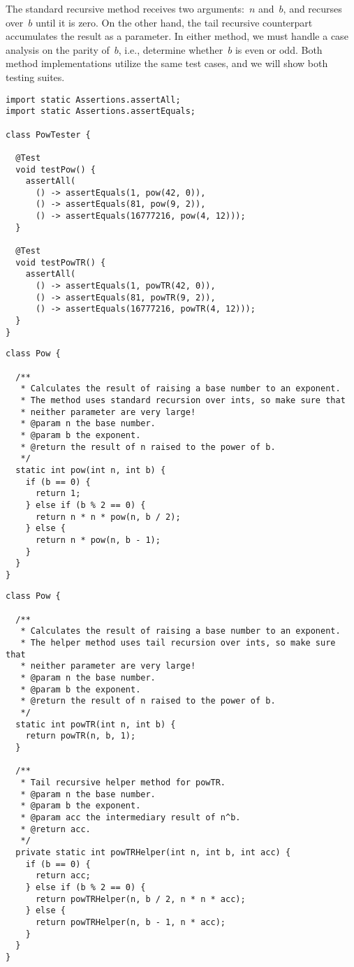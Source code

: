 The standard recursive  method receives two arguments:~$n$ and~$b$, and recurses over~$b$ until it is zero.
On the other hand, the tail recursive counterpart accumulates the result as a parameter.
In either method, we must handle a case analysis on the parity of~$b$, i.e., determine whether~$b$ is even or odd.
Both method implementations utilize the same test cases, and we will show both testing suites.

\begin{lstlisting}[language=MyJava]
import static Assertions.assertAll;
import static Assertions.assertEquals;

class PowTester {

  @Test
  void testPow() {
    assertAll(
      () -> assertEquals(1, pow(42, 0)),
      () -> assertEquals(81, pow(9, 2)),
      () -> assertEquals(16777216, pow(4, 12)));
  }

  @Test
  void testPowTR() {
    assertAll(
      () -> assertEquals(1, powTR(42, 0)),
      () -> assertEquals(81, powTR(9, 2)),
      () -> assertEquals(16777216, powTR(4, 12)));
  }
}
\end{lstlisting}

\begin{lstlisting}[language=MyJava]
class Pow {

  /**
   * Calculates the result of raising a base number to an exponent.
   * The method uses standard recursion over ints, so make sure that
   * neither parameter are very large!
   * @param n the base number.
   * @param b the exponent.
   * @return the result of n raised to the power of b.
   */
  static int pow(int n, int b) {
    if (b == 0) {
      return 1;
    } else if (b % 2 == 0) {
      return n * n * pow(n, b / 2);
    } else {
      return n * pow(n, b - 1);
    }
  }
}
\end{lstlisting}

\begin{lstlisting}[language=MyJava]
class Pow {

  /**
   * Calculates the result of raising a base number to an exponent.
   * The helper method uses tail recursion over ints, so make sure that
   * neither parameter are very large!
   * @param n the base number.
   * @param b the exponent.
   * @return the result of n raised to the power of b.
   */
  static int powTR(int n, int b) {
    return powTR(n, b, 1);
  }

  /**
   * Tail recursive helper method for powTR.
   * @param n the base number.
   * @param b the exponent.
   * @param acc the intermediary result of n^b.
   * @return acc.
   */
  private static int powTRHelper(int n, int b, int acc) {
    if (b == 0) { 
      return acc; 
    } else if (b % 2 == 0) {
      return powTRHelper(n, b / 2, n * n * acc);
    } else {
      return powTRHelper(n, b - 1, n * acc);
    }
  }
}
\end{lstlisting}

